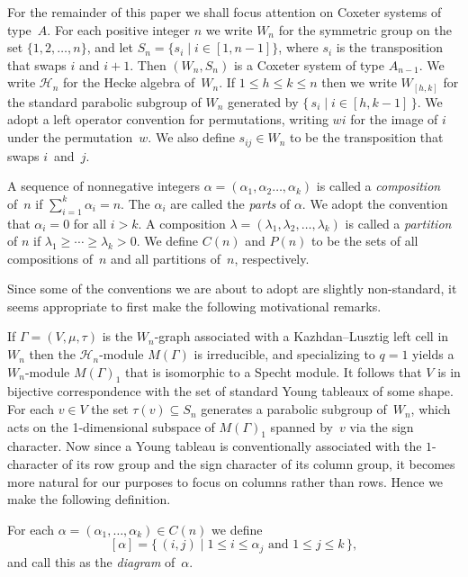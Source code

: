 \documentclass[ALCO,ThmDefs,Unicode,epreuves]{cedram}
\begin{document}
For the remainder of this paper we shall focus attention on Coxeter systems
of type~$A$. For each positive integer $n$ we write $W_n$ for the symmetric
group on the set $\{1,2,\ldots,n\}$, and let $S_n=\{s_i\mid i \in [1,n-1]\}$,
where $s_i$ is the transposition that swaps $i$ and $i+1$. Then $(W_n,S_n)$
is a Coxeter system of type $A_{n-1}$. We write $\mathcal{H}_n$ for the
Hecke algebra of~$W_n$. If $1\leqslant h\leqslant k\leqslant n$ then we write
$W_{[h,k]}$ for the standard parabolic subgroup of $W_n$ generated by
$\{\,s_i\mid i\in[h,k-1]\,\}$. We adopt a left operator convention for permutations,
writing $wi$ for the image of $i$ under the permutation~$w$. We also define
$s_{ij}\in W_n$ to be the transposition that swaps $i$~and~$j$.

A sequence of nonnegative integers $\alpha =
(\alpha_{1},\alpha_{2} \ldots, \alpha_{k})$ is called a \emph{composition}
of~$n$ if $\sum_{i=1}^k\alpha_i=n$. The $\alpha_i$ are called the \emph{parts}
of $\alpha$. We adopt the convention that $\alpha_i=0$ for all $i>k$.
A composition $\lambda = (\lambda_1,\lambda_2,\ldots,\lambda_k)$ is called a
\emph{partition} of $n$ if $\lambda_{1} \ge \cdots \ge \lambda_{k}>0$.
We define $C(n)$ and $P(n)$ to be the sets
of all compositions of~$n$ and all partitions of~$n$, respectively.

Since some of the conventions we are about to adopt are slightly non-standard, it seems
appropriate to first make the following motivational remarks.

If $\Gamma=(V,\mu,\tau)$ is the $W_n\!$-graph associated with a Kazhdan--Lusztig
left cell in~$W_n$ then the $\mathcal{H}_n$-module $M(\Gamma)$ is irreducible,
and specializing to $q=1$ yields a $W_n$-module $M(\Gamma)_1$ that is isomorphic
to a Specht module. It follows that $V$ is in bijective correspondence with
the set of standard Young tableaux of some shape. For each $v\in V$ the set
$\tau(v)\subseteq S_n$ generates a parabolic subgroup of~$W_n$, which acts on the
1-dimensional subspace of $M(\Gamma)_1$ spanned by~$v$ via the sign character.
Now since a Young tableau is conventionally associated with the $1$-character of its row
group and the sign character of its column group, it becomes more natural for
our purposes to focus on columns rather than rows. Hence we make
the following definition.

\begin{defi}\label{diagram}
For each
$\alpha=(\alpha_{1},\ldots,\alpha_{k})\in C(n)$ we define
\[[\alpha]=
\{\,(i,j)\mid1\leqslant i\leqslant\alpha_{j}\text{ and }1\leqslant
j\leqslant k\,\},
\]
and call this as the \emph{diagram} of~$\alpha$.
\end{defi}
\end{document}
